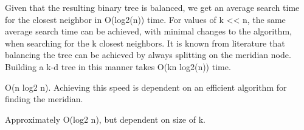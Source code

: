 

Given that the resulting binary tree is balanced, we get an average search time for the closest neighbor in O(log2(n)) time. For values of k << n, the same average search time can be achieved, with minimal changes to the algorithm, when searching for the k closest neighbors. It is known from literature that balancing the tree can be achieved by always splitting on the meridian node. Building a k-d tree in this manner takes O(kn log2(n)) time.





    \item O(n log2 n). Achieving this speed is dependent on an efficient algorithm for finding the meridian.
    \item Approximately O(log2 n), but dependent on size of k.





